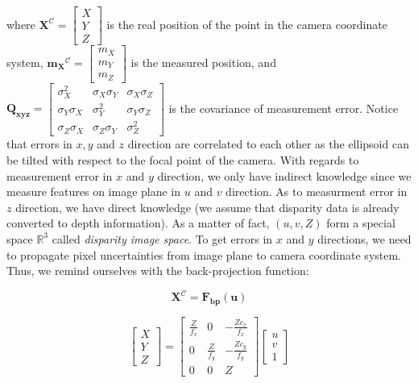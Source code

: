 \documentclass[a4paper]{report}
\numberwithin{figure}{section}
\newcommand{\R}{\mathbb{R}}
\begin{document}
where $\mathbf{X}^{\mathcal{C}} = \begin{bmatrix} X \\ Y \\ Z\end{bmatrix}$ is
the real position of the point in the camera coordinate system,
$\mathbf{m_X}^{\mathcal{C}} = \begin{bmatrix} m_X \\ m_Y \\ m_Z \end{bmatrix}$
is the measured position, and $\mathbf{Q_{xyz}} = \begin{bmatrix} \sigma_X^2 &
\sigma_X\sigma_Y & \sigma_X\sigma_Z \\ \sigma_Y\sigma_X & \sigma_Y^2 &
\sigma_Y\sigma_Z\\ \sigma_Z\sigma_X & \sigma_Z\sigma_Y &
\sigma_Z^2\end{bmatrix}$ is the covariance of measurement error.  Notice that
errors in $x,y$ and $z$ direction are correlated to each other as the ellipsoid
can be tilted with respect to the focal point of the camera.  With regards to
measurement error in $x$ and $y$ direction, we only have indirect knowledge
since we measure features on image plane in $u$ and $v$ direction.  As to
measurment error in $z$ direction, we have direct knowledge (we assume that
disparity data is already converted to depth information).  As a matter of
fact, $(u,v,Z)$ form a special space $\R^3$ called \textit{disparity image
space}.  To get errors in $x$ and $y$ directions, we need to propagate pixel
uncertainties from image plane to camera coordinate system. Thus, we remind
ourselves with the back-projection function:

\begin{equation} \mathbf{X}^{\mathcal{C}} = \mathbf{F_{bp}}(\mathbf{u})
\end{equation}

\begin{equation} \begin{bmatrix} X \\ Y \\ Z \end{bmatrix} = \begin{bmatrix}
\frac{Z}{f_x} & 0 & -\frac{Z c_x}{f_x} \\ 0 & \frac{Z}{f_y} & -\frac{Z
c_y}{f_y} \\ 0 & 0 & Z \end{bmatrix} \begin{bmatrix} u \\ v \\ 1 \end{bmatrix}
\end{equation}
\end{document}
